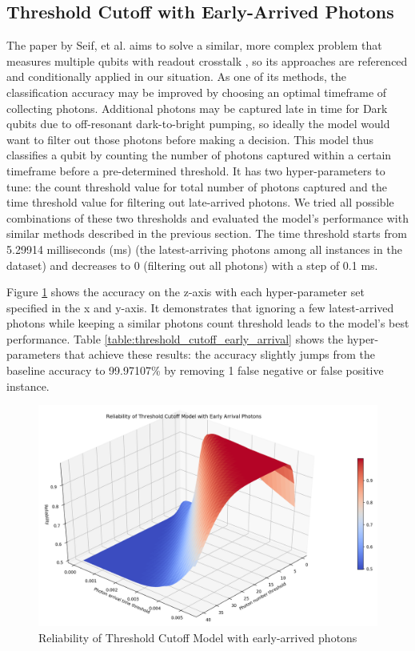 \documentclass[letterpaper,twocolumn,10pt]{article}
\begin{document}
\subsection{Threshold Cutoff with Early-Arrived Photons}

The paper by Seif, et al. aims to solve a similar, more complex problem that measures multiple qubits with readout crosstalk \cite{ml-qubit}, so its approaches are referenced and conditionally applied in our situation. As one of its methods, the classification accuracy may be improved by choosing an optimal timeframe of collecting photons. Additional photons may be captured late in time for Dark qubits due to off-resonant dark-to-bright pumping, so ideally the model would want to filter out those photons before making a decision. This model thus classifies a qubit by counting the number of photons captured within a certain timeframe before a pre-determined threshold. It has two hyper-parameters to tune: the count threshold value for total number of photons captured and the time threshold value for filtering out late-arrived photons. We tried all possible combinations of these two thresholds and evaluated the model's performance with similar methods described in the previous section. The time threshold starts from 5.29914 milliseconds (ms) (the latest-arriving photons among all instances in the dataset) and decreases to 0 (filtering out all photons) with a step of 0.1 ms.

Figure \ref{fig:threshold_cutoff_early_arrival} shows the accuracy on the z-axis with each hyper-parameter set specified in the x and y-axis. It demonstrates that ignoring a few latest-arrived photons while keeping a similar photons count threshold leads to the model's best performance. Table \ref{table:threshold_cutoff_early_arrival} shows the hyper-parameters that achieve these results: the accuracy slightly jumps from the baseline accuracy to 99.97107\% by removing 1 false negative or false positive instance.

\begin{figure}
    \includegraphics[width=\linewidth]{Figures/threshold_cutoff_early_arrival_accuracy.png}
    \centering
    \caption{Reliability of Threshold Cutoff Model with early-arrived photons}
    \label{fig:threshold_cutoff_early_arrival}
\end{figure}
\end{document}
